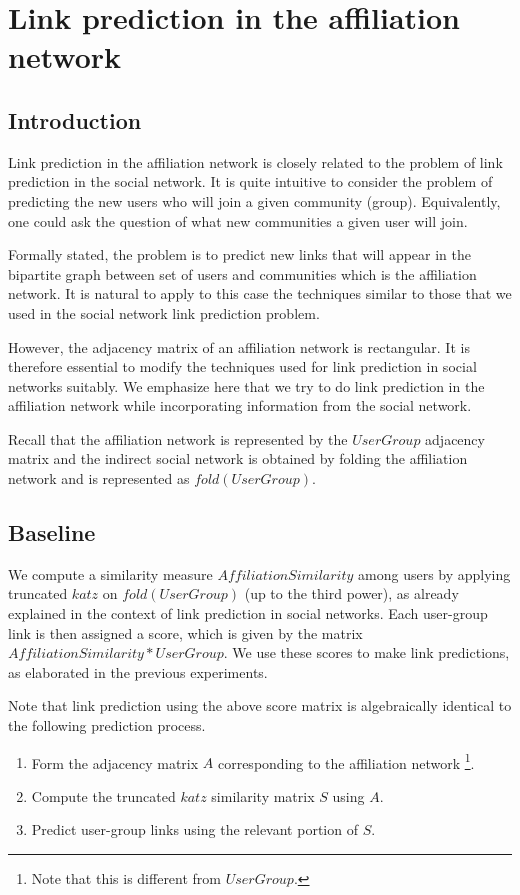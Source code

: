 \documentclass{report}
\begin{document}
\chapter{Link prediction in the affiliation network}
\section{Introduction}
Link prediction in the affiliation network is closely related to the problem of link prediction in the social network. It is quite intuitive to consider the problem of predicting the new users who will join a given community (group). Equivalently, one could ask the question of what new communities a given user will join. 

Formally stated, the problem is to predict new links that will appear in the bipartite graph between set of users and communities which is the affiliation network. It is natural to apply to this case the techniques similar to those that we used in the social network link prediction problem.

However, the adjacency matrix of an affiliation network is rectangular. It is therefore essential to modify the techniques used for link prediction in social networks suitably. We emphasize here that we try to do link prediction in the affiliation network while incorporating information from the social network. 

Recall that the affiliation network is represented by the $UserGroup$ adjacency matrix and the indirect social network is obtained by folding the affiliation network and is represented as $fold(UserGroup)$.

\section{Baseline}
We compute a similarity measure $AffiliationSimilarity$ among users by applying truncated $katz$ on $fold(UserGroup)$ (up to the third power), as already explained in the context of link prediction in social networks. Each user-group link is then assigned a score, which is given by the matrix $AffiliationSimilarity*UserGroup$. We use these scores to make link predictions, as elaborated in the previous experiments.

Note that link prediction using the above score matrix is algebraically identical to the following prediction process. 

\begin{enumerate}
 \item Form the adjacency matrix $A$ corresponding to the affiliation network \footnote{Note that this is different from $UserGroup$.}.
 \item Compute the truncated $katz$ similarity matrix $S$ using $A$. 
 \item Predict user-group links using the relevant portion of $S$.
\end{enumerate}
\end{document}

